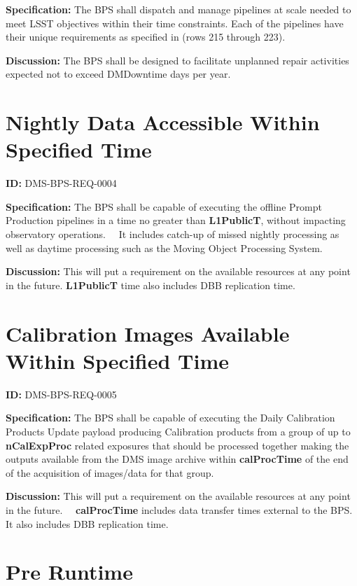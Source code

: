 \documentclass[SE,toc,lsstdraft]{lsstdoc}
\begin{document}
\textbf{Specification:}
The BPS shall dispatch and manage pipelines at scale needed to meet LSST objectives within their time constraints. Each of the pipelines have their unique requirements as specified in  (rows 215 through 223).

\textbf{Discussion:}
The BPS shall be designed to facilitate unplanned repair activities expected not to exceed DMDowntime days per year.

\section{Nightly Data Accessible Within Specified Time}

\label{DMS-BPS-REQ-0004}
\textbf{ID:} DMS-BPS-REQ-0004

\textbf{Specification:}
The BPS shall be capable of executing the offline Prompt Production pipelines in a time no greater than \textbf{L1PublicT}, without impacting observatory operations.   It includes catch-up of missed nightly processing as well as daytime processing such as the Moving Object Processing System.

\textbf{Discussion:}
This will put a requirement on the available resources at any point in the future. \textbf{L1PublicT} time also includes DBB replication time.

\section{Calibration Images Available Within Specified Time}

\label{DMS-BPS-REQ-0005}
\textbf{ID:} DMS-BPS-REQ-0005

\textbf{Specification:}
The BPS shall be capable of executing the Daily Calibration Products Update payload producing Calibration products from a group of up to \textbf{nCalExpProc} related exposures that should be processed together making the outputs available from the DMS image archive within \textbf{calProcTime} of the end of the acquisition of images/data for that group.

\textbf{Discussion:}
This will put a requirement on the available resources at any point in the future.   \textbf{calProcTime} includes data transfer times external to the BPS. It also includes DBB replication time.

\section{Pre Runtime}
\end{document}
